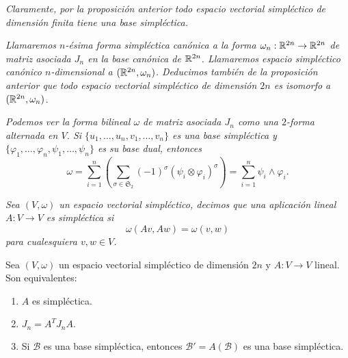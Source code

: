 \begin{obs}
  \em
  Claramente, por la proposición anterior todo espacio vectorial simpléctico de dimensión finita tiene una base simpléctica.
\end{obs}
\begin{obs}
  \em
  Llamaremos \emph{$n$-ésima forma simpléctica canónica} a la forma $\omega_n:\mathbb{R}^{2n} \rightarrow \mathbb{R}^{2n}$ de matriz asociada $J_n$ en la base canónica de $\mathbb{R}^{2n}$. Llamaremos \emph{espacio simpléctico canónico $n$-dimensional} a $(\mathbb{R}^{2n},\omega_n)$. Deducimos también de la proposición anterior que todo espacio vectorial simpléctico de dimensión $2n$ es isomorfo a $(\mathbb{R}^{2n},\omega_n)$.
\end{obs}
\begin{obs}
  \em
  Podemos ver la forma bilineal $\omega$ de matriz asociada $J_n$ como una $2$-forma alternada en $V$. Si $\{u_1,\dots,u_n,v_1,\dots,v_n\}$ es una base simpléctica y $\{\varphi_1,\dots, \varphi_n, \psi_1,\dots, \psi_n \}$ es su base dual, entonces
  \[
    \omega = \sum_{i=1}^n \left(\sum_{\sigma \in \mathfrak{S}_2} (-1)^{\sigma} (\psi_i \otimes \varphi_i)^{\sigma}\right)= \sum_{i=1}^n \psi_i \wedge \varphi_i.
  \]
\end{obs}
\begin{defn}
  \em
  Sea $(V,\omega)$ un espacio vectorial simpléctico, decimos que una aplicación lineal $A:V \rightarrow V$ es \emph{simpléctica} si
  \[
    \omega(Av,Aw) = \omega(v,w)
  \]
  para cualesquiera $v,w \in V$.
\end{defn}
\begin{prop}
  Sea $(V,\omega)$ un espacio vectorial simpléctico de dimensión $2n$ y $A: V \rightarrow V$ lineal. Son equivalentes:
  \begin{enumerate}
    \item $A$ es simpléctica.
    \item $J_n=A^T J_n A.$
    
    \item Si $\mathcal{B}$ es una base simpléctica, entonces $\mathcal{B}'=A(\mathcal{B})$ es una base simpléctica.
  \end{enumerate}
\end{prop}
